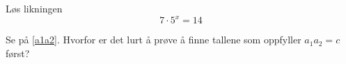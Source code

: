 






\opgt	

Løs likningen 
\[7\cdot5^x=14 \]	
	
Se på \eqref{a1a2}. Hvorfor er det lurt å prøve å finne tallene som oppfyller $ a_1a_2 =c $ først?
